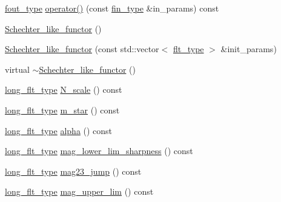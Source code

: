 \begin{DoxyCompactItemize}
\item 
\hyperlink{classIceBRG_1_1Schechter__like__functor_a90c760c2efcd3ae2b3a7f733672b18ed}{fout\-\_\-type} \hyperlink{classIceBRG_1_1Schechter__like__functor_af58cca1d9091086949437f9c07e1f8f9}{operator()} (const \hyperlink{classIceBRG_1_1Schechter__like__functor_aa444797b63bb4d4b01859b9c6a5d528e}{fin\-\_\-type} \&in\-\_\-params) const 
\item 
\hyperlink{classIceBRG_1_1Schechter__like__functor_a98942cf327953bc6de8cdd53fde65ef7}{Schechter\-\_\-like\-\_\-functor} ()
\item 
\hyperlink{classIceBRG_1_1Schechter__like__functor_a7541884f43f2cf37783e2abb84dc6347}{Schechter\-\_\-like\-\_\-functor} (const std\-::vector$<$ \hyperlink{lib_2IceBRG__main_2common_8h_ad0f130a56eeb944d9ef2692ee881ecc4}{flt\-\_\-type} $>$ \&init\-\_\-params)
\item 
virtual \hyperlink{classIceBRG_1_1Schechter__like__functor_aaf1a25297a4e050deab517c7e1edebfb}{$\sim$\-Schechter\-\_\-like\-\_\-functor} ()
\item 
\hyperlink{lib_2IceBRG__main_2common_8h_a7040956e7e1b504d34a9ccfb4253bdce}{long\-\_\-flt\-\_\-type} \hyperlink{classIceBRG_1_1Schechter__like__functor_a1d3bc3f012974c5e771113c611dfc8a8}{N\-\_\-scale} () const 
\item 
\hyperlink{lib_2IceBRG__main_2common_8h_a7040956e7e1b504d34a9ccfb4253bdce}{long\-\_\-flt\-\_\-type} \hyperlink{classIceBRG_1_1Schechter__like__functor_a2166028d7e17a3a97a397e8b95cda94f}{m\-\_\-star} () const 
\item 
\hyperlink{lib_2IceBRG__main_2common_8h_a7040956e7e1b504d34a9ccfb4253bdce}{long\-\_\-flt\-\_\-type} \hyperlink{classIceBRG_1_1Schechter__like__functor_a7f576357e46eed8edcf30e7950ebaaac}{alpha} () const 
\item 
\hyperlink{lib_2IceBRG__main_2common_8h_a7040956e7e1b504d34a9ccfb4253bdce}{long\-\_\-flt\-\_\-type} \hyperlink{classIceBRG_1_1Schechter__like__functor_a61505822b606261f916582fe719f5208}{mag\-\_\-lower\-\_\-lim\-\_\-sharpness} () const 
\item 
\hyperlink{lib_2IceBRG__main_2common_8h_a7040956e7e1b504d34a9ccfb4253bdce}{long\-\_\-flt\-\_\-type} \hyperlink{classIceBRG_1_1Schechter__like__functor_a562f01c56a7652050f5e501384ae7dbc}{mag23\-\_\-jump} () const 
\item 
\hyperlink{lib_2IceBRG__main_2common_8h_a7040956e7e1b504d34a9ccfb4253bdce}{long\-\_\-flt\-\_\-type} \hyperlink{classIceBRG_1_1Schechter__like__functor_adf075005214a553d0a7ed0b4ad112487}{mag\-\_\-upper\-\_\-lim} () const 

\end{DoxyCompactItemize}
